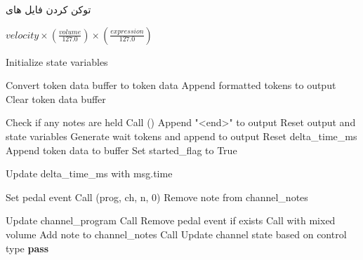 \begin{LTR}
      \begin{algorithm}
            \caption{توکن کردن فایل های }
            \label{alg:token}
            \setmainfont{Times New Roman}
            \begin{algorithmic}[1]
                  \State \Return $velocity \times \left(\frac{volume}{127.0}\right) \times \left(\frac{expression}{127.0}\right)$
                  \EndFunction

                  \State Initialize state variables

                  \State Convert token data buffer to token data
                  \State Append formatted tokens to output
                  \State Clear token data buffer
                  \EndFunction

                  \State Check if any notes are held
                  \State Call ()
                  \State Append "<end>" to output
                  \State Reset output and state variables
                  \EndIf
                  \EndIf
                  \State Generate wait tokens and append to output
                  \State Reset delta\_time\_ms
                  \State Append token data to buffer
                  \State Set started\_flag to True
                  \EndIf
                  \EndFunction

                  \State Update delta\_time\_ms with msg.time

                  \State Set pedal event
                  \Else
                  \State Call (prog, ch, n, 0)
                  \State Remove note from channel\_notes
                  \EndIf
                  \EndFunction

                  \State Update channel\_program
                  \State Call 
                  \Else
                  \State Remove pedal event if exists
                  \State Call  with mixed volume
                  \State Add note to channel\_notes
                  \EndIf
                  \State Call 
                  \State Update channel state based on control type
                  \Else
                  \State \textbf{pass}
                  \EndIf
                  \EndFor


\end{algorithmic}
\end{algorithm}
\end{LTR}
